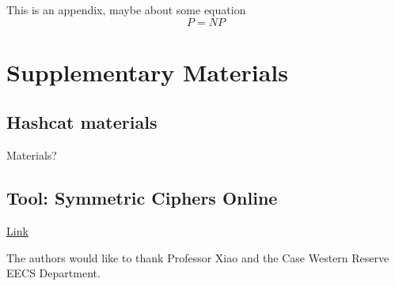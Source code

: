 \documentclass[acmlarge]{acmart}
\begin{document}
This is an appendix, maybe about some equation
\begin{displaymath}
P=NP
\end{displaymath}

\section{Supplementary Materials}

\subsection{Hashcat materials}

Materials?

\subsection{Tool: Symmetric Ciphers Online }

\href{http://symmetric-ciphers.online-domain-tools.com/}{Link}

\begin{acks}

The authors would like to thank Professor Xiao and the Case Western Reserve EECS Department.

\end{acks}



\end{document}
